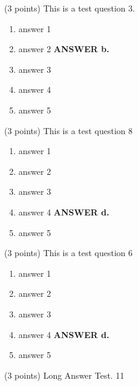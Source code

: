 \documentclass{article}
\newcommand{\ans}[1]{ \ifnum\showans=1 {\bf ANSWER #1.} \fi }
\begin{document}

\item (3 points) This is a test question 3.
  \begin{enumerate}
  \item answer 1
  \item answer 2  \ans{b}
  \item answer 3
  \item answer 4
  \item answer 5
  \end{enumerate}

\item (3 points) This is a test question 8
  \begin{enumerate}
  \item answer 1
  \item answer 2
  \item answer 3
  \item answer 4  \ans{d}
  \item answer 5
  \end{enumerate}

\item (3 points) This is a test question 6
  \begin{enumerate}
  \item answer 1
  \item answer 2
  \item answer 3
  \item answer 4  \ans{d}
  \item answer 5
  \end{enumerate}

\item (3 points) Long Answer Test. 11
\end{document}
